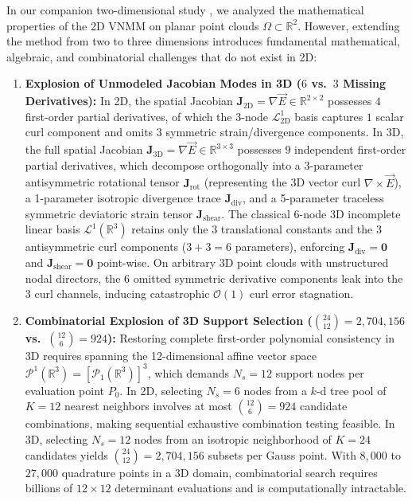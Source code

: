 \documentclass[preprint,12pt]{elsarticle}
\newcommand{\curl}{\nabla \times}
\newcommand{\R}{\mathbb{R}}
\begin{document}
In our companion two-dimensional study \cite{Mesquita2026VNMM2D}, we analyzed the mathematical properties of the 2D VNMM on planar point clouds $\Omega \subset \R^2$. However, extending the method from two to three dimensions introduces fundamental mathematical, algebraic, and combinatorial challenges that do not exist in 2D:
\begin{enumerate}
    \item \textbf{Explosion of Unmodeled Jacobian Modes in 3D ($6$ vs.\ $3$ Missing Derivatives):} In 2D, the spatial Jacobian $\mathbf{J}_{2\text{D}} = \nabla\vec{E} \in \R^{2\times 2}$ possesses $4$ first-order partial derivatives, of which the 3-node $\mathcal{L}^1_{2\text{D}}$ basis captures $1$ scalar curl component and omits $3$ symmetric strain/divergence components. In 3D, the full spatial Jacobian $\mathbf{J}_{3\text{D}} = \nabla\vec{E} \in \R^{3\times 3}$ possesses $9$ independent first-order partial derivatives, which decompose orthogonally into a 3-parameter antisymmetric rotational tensor $\mathbf{J}_{\text{rot}}$ (representing the 3D vector curl $\curl\vec{E}$), a 1-parameter isotropic divergence trace $\mathbf{J}_{\text{div}}$, and a 5-parameter traceless symmetric deviatoric strain tensor $\mathbf{J}_{\text{shear}}$. The classical 6-node 3D incomplete linear basis $\mathcal{L}^1(\R^3)$ retains only the 3 translational constants and the 3 antisymmetric curl components ($3+3=6$ parameters), enforcing $\mathbf{J}_{\text{div}} = \mathbf{0}$ and $\mathbf{J}_{\text{shear}} = \mathbf{0}$ point-wise. On arbitrary 3D point clouds with unstructured nodal directors, the $6$ omitted symmetric derivative components leak into the $3$ curl channels, inducing catastrophic $\mathcal{O}(1)$ curl error stagnation.
    \item \textbf{Combinatorial Explosion of 3D Support Selection ($\binom{24}{12} = 2{,}704{,}156$ vs.\ $\binom{12}{6} = 924$):} Restoring complete first-order polynomial consistency in 3D requires spanning the 12-dimensional affine vector space $\mathcal{P}^1(\R^3) = [\mathcal{P}_1(\R^3)]^3$, which demands $N_s = 12$ support nodes per evaluation point $P_0$. In 2D, selecting $N_s = 6$ nodes from a $k$-d tree pool of $K=12$ nearest neighbors involves at most $\binom{12}{6} = 924$ candidate combinations, making sequential exhaustive combination testing feasible. In 3D, selecting $N_s = 12$ nodes from an isotropic neighborhood of $K=24$ candidates yields $\binom{24}{12} = 2{,}704{,}156$ subsets per Gauss point. With $8{,}000$ to $27{,}000$ quadrature points in a 3D domain, combinatorial search requires billions of $12\times 12$ determinant evaluations and is computationally intractable.

\end{enumerate}
\end{document}

